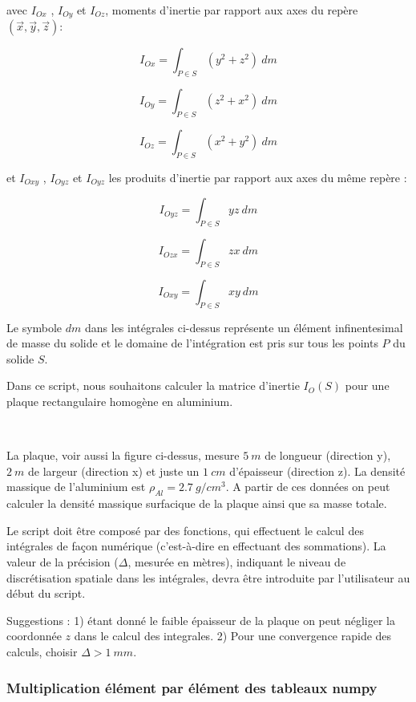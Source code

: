 \documentclass{article}
\begin{document}
    avec \(I_{Ox}\) , \(I_{Oy}\) et \(I_{Oz}\), moments d'inertie par
rapport aux axes du repère \((\vec{x},\vec{y},\vec{z})\):

    \[I_{Ox} = \int_{P\in S} (y^2+z^2)\ dm\]

\[I_{Oy} = \int_{P\in S} (z^2+x^2)\ dm\]

\[I_{Oz} = \int_{P\in S} (x^2+y^2)\ dm\]

    et \(I_{Oxy}\) , \(I_{Oyz}\) et \(I_{Oyz}\) les produits d'inertie par
rapport aux axes du même repère :

    \[I_{Oyz} = \int_{P\in S} yz \ dm\]

\[I_{Ozx} = \int_{P\in S} zx \ dm\]

\[I_{Oxy} = \int_{P\in S} xy \ dm\]

    Le symbole \(dm\) dans les intégrales ci-dessus représente un élément
infinentesimal de masse du solide et le domaine de l'intégration est
pris sur tous les points \(P\) du solide \(S\).

    Dans ce script, nous souhaitons calculer la matrice d'inertie
\(I_{O}(S)\) pour une plaque rectangulaire homogène en aluminium.

    \begin{center}
    \end{center}
    { \hspace*{\fill} \\}
    

    La plaque, voir aussi la figure ci-dessus, mesure \(5\ m\) de longueur
(direction y), \(2\ m\) de largeur (direction x) et juste un \(1 \ cm\)
d'épaisseur (direction z). La densité massique de l'aluminium est
\(\rho_{Al} = 2.7 \ g / cm^{3}\). A partir de ces données on peut
calculer la densité massique surfacique de la plaque ainsi que sa masse
totale.

Le script doit être composé par des fonctions, qui effectuent le calcul
des intégrales de façon numérique (c'est-à-dire en effectuant des
sommations). La valeur de la précision (\(\Delta\), mesurée en mètres),
indiquant le niveau de discrétisation spatiale dans les intégrales,
devra être introduite par l'utilisateur au début du script.

Suggestions : 1) étant donné le faible épaisseur de la plaque on peut
négliger la coordonnée \(z\) dans le calcul des integrales. 2) Pour une
convergence rapide des calculs, choisir \(\Delta > 1\ mm\).

    \subsubsection{Multiplication élément par élément des tableaux
numpy}\label{multiplication-uxe9luxe9ment-par-uxe9luxe9ment-des-tableaux-numpy}
\end{document}
